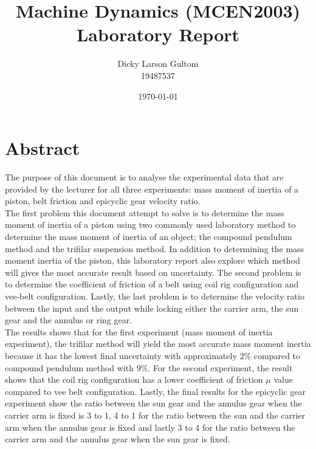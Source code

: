 \documentclass[12pt,a4paper]{report}
\begin{document}
\raggedbottom
\onehalfspacing

\title{Machine Dynamics (MCEN2003) \\  Laboratory Report}
\author{Dicky Larson Gultom \\ 19487537 \\}
\date{\today}
\maketitle

\newpage
{}
\chapter*{Abstract}
The purpose of this document is to analyse the experimental data that are provided by the lecturer for all three experiments: mass moment of inertia of a piston, belt friction and epicyclic gear velocity ratio. \\

The first problem this document attempt to solve is to determine the mass moment of inertia of a piston using two commonly used laboratory method to determine the mass moment of inertia of an object; the compound pendulum method and the trifilar suspension method. In addition to determining the mass moment inertia of the piston, this laboratory report also explore which method will gives the most accurate result based on uncertainty. The second problem is to determine the coefficient of friction of a belt using coil rig configuration and vee-belt configuration. Lastly, the last problem is to determine the velocity ratio between the input and the output while locking either the carrier arm, the sun gear and the annulus or ring gear.\\

The results shows that for the first experiment (mass moment of inertia experiment), the trifilar method will yield the most accurate mass moment inertia because it has the lowest final uncertainty with approximately $2\%$ compared to compound pendulum method with $9\%$. For the second experiment, the result shows that the coil rig configuration has a lower coefficient of friction $\mu$ value compared to vee belt configuration. Lastly, the final results for the epicyclic gear experiment show the ratio between the sun gear and the annulus gear when the carrier arm is fixed is 3 to 1, 4 to 1 for the ratio between the sun and the carrier arm when the annulus gear is fixed and lastly 3 to 4 for the ratio between the carrier arm and the annulus gear when the sun gear is fixed. 
\end{document}

